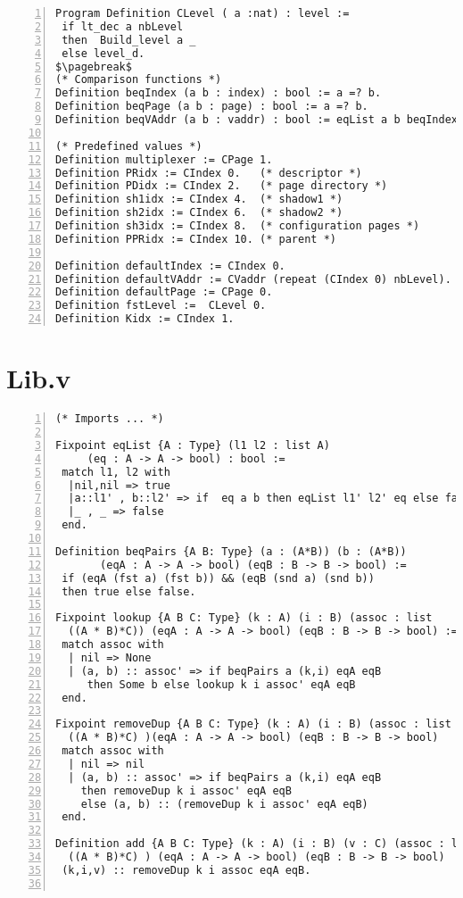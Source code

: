 \begin{appendices}
\begin{lstlisting}[xleftmargin=-.1\textwidth,
xrightmargin=-.1\textwidth,
mathescape=true,numbers=left]
Program Definition CLevel ( a :nat) : level := 
 if lt_dec a nbLevel 
 then  Build_level a _ 
 else level_d.
$\pagebreak$
(* Comparison functions *)
Definition beqIndex (a b : index) : bool := a =? b.
Definition beqPage (a b : page) : bool := a =? b.
Definition beqVAddr (a b : vaddr) : bool := eqList a b beqIndex.

(* Predefined values *)
Definition multiplexer := CPage 1.
Definition PRidx := CIndex 0.   (* descriptor *)
Definition PDidx := CIndex 2.   (* page directory *)
Definition sh1idx := CIndex 4.  (* shadow1 *) 
Definition sh2idx := CIndex 6.  (* shadow2 *)
Definition sh3idx := CIndex 8.  (* configuration pages *)
Definition PPRidx := CIndex 10. (* parent *)

Definition defaultIndex := CIndex 0.
Definition defaultVAddr := CVaddr (repeat (CIndex 0) nbLevel).
Definition defaultPage := CPage 0.
Definition fstLevel :=  CLevel 0.
Definition Kidx := CIndex 1.
\end{lstlisting}

\chapter{Lib.v} \label{LibFile}
\begin{lstlisting}[xleftmargin=-.1\textwidth,
xrightmargin=-.1\textwidth,
mathescape=true,numbers=left]
(* Imports ... *)

Fixpoint eqList {A : Type} (l1 l2 : list A) 
	 (eq : A -> A -> bool) : bool := 
 match l1, l2 with 
  |nil,nil => true
  |a::l1' , b::l2' => if  eq a b then eqList l1' l2' eq else false
  |_ , _ => false
 end.

Definition beqPairs {A B: Type} (a : (A*B)) (b : (A*B)) 
	   (eqA : A -> A -> bool) (eqB : B -> B -> bool) :=
 if (eqA (fst a) (fst b)) && (eqB (snd a) (snd b))  
 then true else false.

Fixpoint lookup {A B C: Type} (k : A) (i : B) (assoc : list 
  ((A * B)*C)) (eqA : A -> A -> bool) (eqB : B -> B -> bool) :=
 match assoc with
  | nil => None  
  | (a, b) :: assoc' => if beqPairs a (k,i) eqA eqB 
  	 then Some b else lookup k i assoc' eqA eqB
 end. 
 
Fixpoint removeDup {A B C: Type} (k : A) (i : B) (assoc : list 
  ((A * B)*C) )(eqA : A -> A -> bool) (eqB : B -> B -> bool)   :=
 match assoc with
  | nil => nil
  | (a, b) :: assoc' => if beqPairs a (k,i) eqA eqB 
  	then removeDup k i assoc' eqA eqB 
  	else (a, b) :: (removeDup k i assoc' eqA eqB)
 end.

Definition add {A B C: Type} (k : A) (i : B) (v : C) (assoc : list 
  ((A * B)*C) ) (eqA : A -> A -> bool) (eqB : B -> B -> bool)  :=
 (k,i,v) :: removeDup k i assoc eqA eqB.


\end{lstlisting}
\end{appendices}
